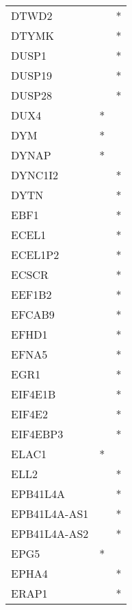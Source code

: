\begin{longtable}{lcc}
DTWD2           &                &          * \\
DTYMK           &                &          * \\
DUSP1           &                &          * \\
DUSP19          &                &          * \\
DUSP28          &                &          * \\
DUX4            &              * &            \\
DYM             &              * &            \\
DYNAP           &              * &            \\
DYNC1I2         &                &          * \\
DYTN            &                &          * \\
EBF1            &                &          * \\
ECEL1           &                &          * \\
ECEL1P2         &                &          * \\
ECSCR           &                &          * \\
EEF1B2          &                &          * \\
EFCAB9          &                &          * \\
EFHD1           &                &          * \\
EFNA5           &                &          * \\
EGR1            &                &          * \\
EIF4E1B         &                &          * \\
EIF4E2          &                &          * \\
EIF4EBP3        &                &          * \\
ELAC1           &              * &            \\
ELL2            &                &          * \\
EPB41L4A        &                &          * \\
EPB41L4A-AS1    &                &          * \\
EPB41L4A-AS2    &                &          * \\
EPG5            &              * &            \\
EPHA4           &                &          * \\
ERAP1           &                &          * \\

\end{longtable}

